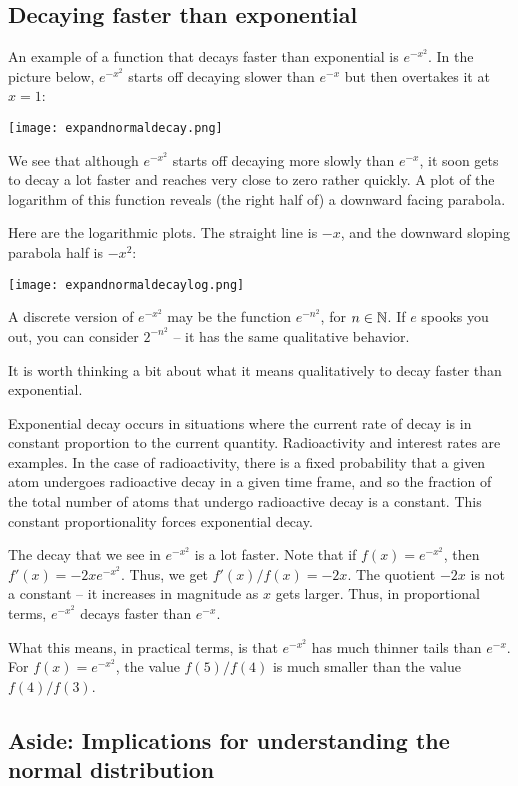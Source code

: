 \documentclass[10pt]{amsart}
\begin{document}
\subsection{Decaying faster than exponential}

An example of a function that decays faster than exponential is
$e^{-x^2}$. In the picture below, $e^{-x^2}$ starts off decaying
slower than $e^{-x}$ but then overtakes it at $x = 1$:

\texttt{[image: expandnormaldecay.png]}

We see that although $e^{-x^2}$ starts off decaying more slowly than
$e^{-x}$, it soon gets to decay a lot faster and reaches very close to
zero rather quickly. A plot of the logarithm of this function reveals
(the right half of) a downward facing parabola.

Here are the logarithmic plots. The straight line is $-x$, and the
downward sloping parabola half is $-x^2$:

\texttt{[image: expandnormaldecaylog.png]}

A discrete version of $e^{-x^2}$ may be the function $e^{-n^2}$, for
$n \in \mathbb{N}$. If $e$ spooks you out, you can consider $2^{-n^2}$ -- it
has the same qualitative behavior.

It is worth thinking a bit about what it means qualitatively to decay
faster than exponential.

Exponential decay occurs in situations where the current rate of decay
is in constant proportion to the current quantity. Radioactivity and
interest rates are examples. In the case of radioactivity, there is a
fixed probability that a given atom undergoes radioactive decay in a
given time frame, and so the fraction of the total number of atoms
that undergo radioactive decay is a constant. This constant
proportionality forces exponential decay.

The decay that we see in $e^{-x^2}$ is a lot faster. Note that if
$f(x) = e^{-x^2}$, then $f'(x) = -2xe^{-x^2}$. Thus, we get
$f'(x)/f(x) = -2x$. The quotient $-2x$ is not a constant -- it
increases in magnitude as $x$ gets larger. Thus, in proportional
terms, $e^{-x^2}$ decays faster than $e^{-x}$.

What this means, in practical terms, is that $e^{-x^2}$ has much
thinner tails than $e^{-x}$. For $f(x) = e^{-x^2}$, the value
$f(5)/f(4)$ is much smaller than the value $f(4)/f(3)$.


\subsection*{Aside: Implications for understanding the normal distribution}
\end{document}
